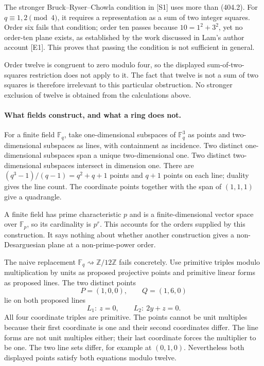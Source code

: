 \documentclass[11pt]{article}
\begin{document}
The stronger Bruck--Ryser--Chowla condition in [S1] uses more than (404.2). For $q\equiv1,2\pmod4$, it requires a representation as a sum of two integer squares. Order six fails that condition; order ten passes because $10=1^2+3^2$, yet no order-ten plane exists, as established by the work discussed in Lam's author account [E1]. This proves that passing the condition is not sufficient in general.

Order twelve is congruent to zero modulo four, so the displayed sum-of-two-squares restriction does not apply to it. The fact that twelve is not a sum of two squares is therefore irrelevant to this particular obstruction. No stronger exclusion of twelve is obtained from the calculations above.

\paragraph{What fields construct, and what a ring does not.}
For a finite field $\mathbb F_q$, take one-dimensional subspaces of $\mathbb F_q^3$ as points and two-dimensional subspaces as lines, with containment as incidence. Two distinct one-dimensional subspaces span a unique two-dimensional one. Two distinct two-dimensional subspaces intersect in dimension one. There are $(q^3-1)/(q-1)=q^2+q+1$ points and $q+1$ points on each line; duality gives the line count. The coordinate points together with the span of $(1,1,1)$ give a quadrangle.

A finite field has prime characteristic $p$ and is a finite-dimensional vector space over $\mathbb F_p$, so its cardinality is $p^r$. This accounts for the orders supplied by this construction. It says nothing about whether another construction gives a non-Desarguesian plane at a non-prime-power order.

The naive replacement $\mathbb F_q\rightsquigarrow\mathbb Z/12\mathbb Z$ fails concretely. Use primitive triples modulo multiplication by units as proposed projective points and primitive linear forms as proposed lines. The two distinct points
\[
 P=(1,0,0),\qquad Q=(1,6,0)
\]
lie on both proposed lines
\[
 L_1:\ z=0,\qquad L_2:\ 2y+z=0.
\]
All four coordinate triples are primitive. The points cannot be unit multiples because their first coordinate is one and their second coordinates differ. The line forms are not unit multiples either; their last coordinate forces the multiplier to be one. The two line sets differ, for example at $(0,1,0)$. Nevertheless both displayed points satisfy both equations modulo twelve.
\end{document}
